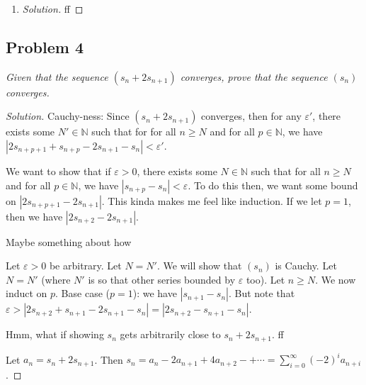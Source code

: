 \documentclass{article}
\newcommand{\N}{{\mathbb N}}
\newcommand{\ep}{{\varepsilon}}
\begin{document}
\begin{enumerate}
\begin{proof}[Solution]
\[		\]
		Furthermore, both $\sum_n x_n^2$ and $\sum_n y_n^2$
		converge,
		so our limit laws tell us that their product must also converge,
		and $R_k$ is just the square of a convergent sequence,
		and so $R_k$ must also converge.
		Additionally, we proved in part (a) that $L_k$ converges.
		Thus, both of their $\limsup$s and $\liminf$s
		must equal each other, so we get
		\[
			\lim_{k\to\infty} L_k \leq \lim_{k\to\infty} R_k
		\]
		But extracting the definitions of $L_k$ and $R_k$,
		this is just
		\[
			\lim_{k\to\infty} \left\lvert\sum_{n=1}^k x_ny_n\right\rvert \leq
			\lim_{k\to\infty} \sqrt{\sum_{n=1}^k x^2_n}\sqrt{\sum_{n=1}^k y^2_n}
		\]
		\[
			\implies |\langle x,y \rangle| =
			\left\lvert\sum_{n=1}^\infty x_ny_n\right\rvert \leq
			\sqrt{\sum_{n=1}^\infty x^2_n}\sqrt{\sum_{n=1}^\infty y^2_n}
			= \lVert x \rVert \lVert y \rVert
		\]
	\end{proof}
	\item \begin{proof}[Solution]\let\qed\relax
		ff
	\end{proof}
\end{enumerate}
\clearpage

\subsection*{Problem 4}
{\it Given that the sequence $(s_n + 2s_{n+1})$ converges,
prove that the sequence $(s_n)$ converges.}
\begin{proof}[Solution]\let\qed\relax
	Cauchy-ness:
	Since $(s_n + 2s_{n+1})$ converges,
	then for any $\ep'$, there exists some $N' \in \N$
	such that for for all $n \geq N$ and for all $p \in \N$,
	we have $|2s_{n+p+1} + s_{n+p} - 2s_{n+1} - s_n| < \ep'$.

	We want to show that if $\ep > 0$,
	there exists some $N \in \N$ such that
	for all $n \geq N$ and for all $p \in \N$,
	we have $|s_{n+p} - s_n| < \ep$.
	To do this then, we want some bound on $|2s_{n+p+1} - 2s_{n+1}|$.
	This kinda makes me feel like induction.
	If we let $p = 1$, then we have $|2s_{n+2} - 2s_{n+1}|$.

	Maybe something about how 

	Let $\ep > 0$ be arbitrary.
	Let $N = N'$.
	We will show that $(s_n)$ is Cauchy.
	Let $N = N'$ (where $N'$ is so that other series bounded by $\ep$ too).
	Let $n \geq N$. We now induct on $p$.
	Base case ($p = 1$):
	we have $|s_{n+1} - s_n|$.
	But note that $\ep > |2s_{n+2} + s_{n+1} - 2s_{n+1} - s_n|
	= |2s_{n+2} - s_{n+1} - s_n|$.

	Hmm, what if showing $s_n$ gets arbitrarily close to $s_n + 2s_{n+1}$.
	ff

	Let $a_n = s_n + 2s_{n+1}$.
	Then $s_n = a_n - 2a_{n+1} + 4a_{n+2} - + \cdots =
	\sum_{i=0}^\infty (-2)^ia_{n+i}$.
\end{proof}
\clearpage
~\clearpage
\end{document}
